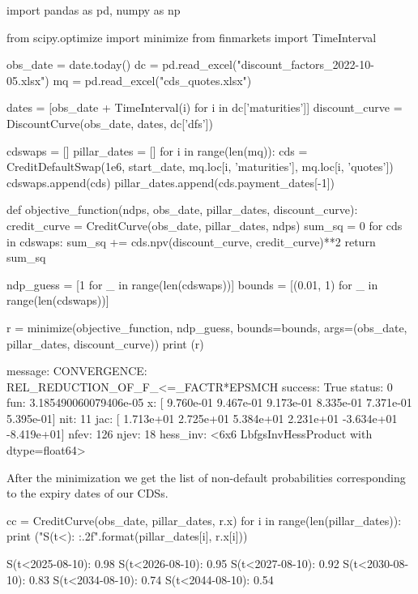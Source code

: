 \begin{ipython}
import pandas as pd, numpy as np

from scipy.optimize import minimize
from finmarkets import TimeInterval

obs_date = date.today()
dc = pd.read_excel("discount_factors_2022-10-05.xlsx")
mq = pd.read_excel("cds_quotes.xlsx")

dates = [obs_date + TimeInterval(i) for i in dc['maturities']]
discount_curve = DiscountCurve(obs_date, dates, dc['dfs'])

cdswaps = []
pillar_dates = []
for i in range(len(mq)):
  cds = CreditDefaultSwap(1e6, start_date, mq.loc[i, 'maturities'], mq.loc[i, 'quotes'])
  cdswaps.append(cds)
  pillar_dates.append(cds.payment_dates[-1])

def objective_function(ndps, obs_date, pillar_dates, discount_curve):
  credit_curve = CreditCurve(obs_date, pillar_dates, ndps)
  sum_sq = 0
  for cds in cdswaps:
      sum_sq += cds.npv(discount_curve, credit_curve)**2
  return sum_sq

ndp_guess = [1 for _ in range(len(cdswaps))]
bounds = [(0.01, 1) for _ in range(len(cdswaps))]

r = minimize(objective_function, ndp_guess, bounds=bounds,
             args=(obs_date, pillar_dates, discount_curve))
print (r)
\end{ipython}
\begin{ioutput}
  message: CONVERGENCE: REL_REDUCTION_OF_F_<=_FACTR*EPSMCH
  success: True
   status: 0
      fun: 3.185490060079406e-05
        x: [ 9.760e-01  9.467e-01  9.173e-01  8.335e-01  7.371e-01
             5.395e-01]
      nit: 11
      jac: [ 1.713e+01  2.725e+01  5.384e+01  2.231e+01 -3.634e+01
            -8.419e+01]
     nfev: 126
     njev: 18
 hess_inv: <6x6 LbfgsInvHessProduct with dtype=float64>
\end{ioutput}

After the minimization we get the list of non-default probabilities corresponding to the expiry dates of our CDSs.

\begin{ipython}
cc = CreditCurve(obs_date, pillar_dates, r.x)
for i in range(len(pillar_dates)):
    print ("S(t<{}): {:.2f}".format(pillar_dates[i], r.x[i]))
\end{ipython}
\begin{ioutput}
S(t<2025-08-10): 0.98
S(t<2026-08-10): 0.95
S(t<2027-08-10): 0.92
S(t<2030-08-10): 0.83
S(t<2034-08-10): 0.74
S(t<2044-08-10): 0.54
\end{ioutput}

